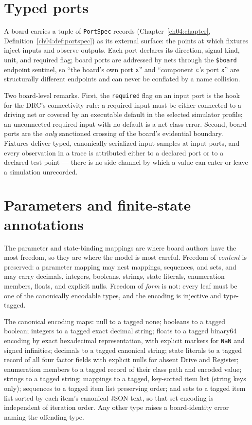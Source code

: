 \section{Typed ports}\label{ch05:sec:ports}

A board carries a tuple of \texttt{PortSpec} records
(Chapter~\ref{ch04:chapter}, Definition~\ref{ch04:def:portspec}) as its
external surface: the points at which fixtures inject inputs and observe
outputs. Each port declares its direction, signal kind, unit, and
required flag; board ports are addressed by nets through the
\texttt{\$board} endpoint sentinel, so ``the board's own port \texttt{x}''
and ``component \texttt{c}'s port \texttt{x}'' are structurally different
endpoints and can never be conflated by a name collision.

Two board-level remarks. First, the \texttt{required} flag on an input
port is the hook for the DRC's connectivity rule: a required input must
be either connected to a driving net or covered by an executable default
in the selected simulator profile; an unconnected required input with no
default is a net-class error. Second, board ports are the \emph{only}
sanctioned crossing of the board's evidential boundary. Fixtures deliver
typed, canonically serialized input samples at input ports, and every
observation in a trace is attributed either to a declared port or to a
declared test point --- there is no side channel by which a value can
enter or leave a simulation unrecorded.

\section{Parameters and finite-state annotations}
\label{ch05:sec:parameters}

The parameter and state-binding mappings are where board authors have the
most freedom, so they are where the model is most careful. Freedom of
\emph{content} is preserved: a parameter mapping may nest mappings,
sequences, and sets, and may carry decimals, integers, booleans, strings,
state literals, enumeration members, floats, and explicit nulls. Freedom
of \emph{form} is not: every leaf must be one of the canonically
encodable types, and the encoding is injective and type-tagged.

\begin{construction}\label{ch05:con:encoding}
The canonical encoding maps: null to a tagged none; booleans to a tagged
boolean; integers to a tagged exact decimal string; floats to a tagged
binary64 encoding by exact hexadecimal representation, with explicit
markers for \texttt{NaN} and signed infinities; decimals to a tagged
canonical string; state literals to a tagged record of all four factor
fields with explicit nulls for absent Drive and Register; enumeration
members to a tagged record of their class path and encoded value;
strings to a tagged string; mappings to a tagged, key-sorted item list
(string keys only); sequences to a tagged item list preserving order;
and sets to a tagged item list sorted by each item's canonical JSON text,
so that set encoding is independent of iteration order. Any other type
raises a board-identity error naming the offending type.
\end{construction}

